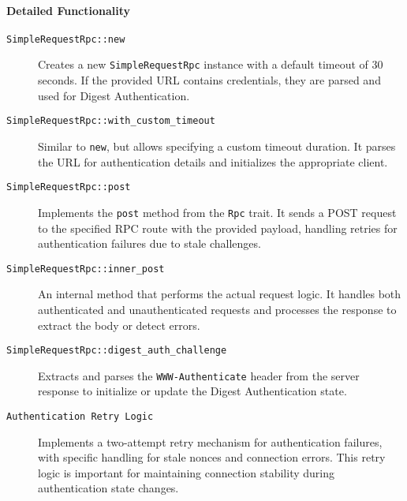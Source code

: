 \paragraph{Detailed Functionality}
\begin{description}
    \item[\texttt{SimpleRequestRpc::new}]  
    Creates a new \texttt{SimpleRequestRpc} instance with a default timeout of 30 seconds.  If the provided URL contains credentials, they are parsed and used for Digest Authentication. %

    \item[\texttt{SimpleRequestRpc::with\_custom\_timeout}]  
    Similar to \texttt{new}, but allows specifying a custom timeout duration.  It parses the URL for authentication details and initializes the appropriate client. %

    \item[\texttt{SimpleRequestRpc::post}]  
    Implements the \texttt{post} method from the \texttt{Rpc} trait.  It sends a POST request to the specified RPC route with the provided payload, handling retries for authentication failures due to stale challenges. %

    \item[\texttt{SimpleRequestRpc::inner\_post}]  
    An internal method that performs the actual request logic.  It handles both authenticated and unauthenticated requests and processes the response to extract the body or detect errors. %

    \item[\texttt{SimpleRequestRpc::digest\_auth\_challenge}]  
    Extracts and parses the \texttt{WWW-Authenticate} header from the server response to initialize or update the Digest Authentication state. %

    \item[\texttt{Authentication Retry Logic}]  
    Implements a two-attempt retry mechanism for authentication failures, with specific handling for stale nonces and connection errors.  This retry logic is important for maintaining connection stability during authentication state changes. %
\end{description}

